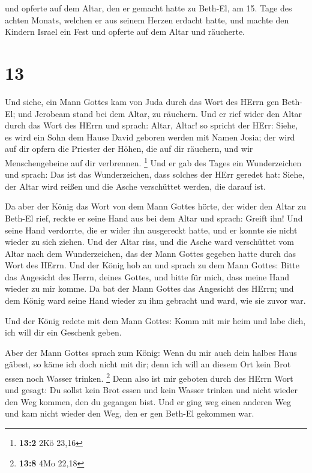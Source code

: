  und opferte auf dem Altar, den er gemacht hatte zu
Beth-El, am 15. Tage des achten Monats, welchen er aus seinem Herzen
erdacht hatte, und machte den Kindern Israel ein Fest und opferte auf
dem Altar und räucherte.

\hypertarget{section-12}{%
\section{13}\label{section-12}}

 Und siehe, ein Mann Gottes kam von Juda durch das Wort
des HErrn gen Beth-El; und Jerobeam stand bei dem Altar, zu räuchern.
 Und er rief wider den Altar durch das Wort des HErrn und
sprach: Altar, Altar! so spricht der HErr: Siehe, es wird ein Sohn dem
Hause David geboren werden mit Namen Josia; der wird auf dir opfern die
Priester der Höhen, die auf dir räuchern, und wir Menschengebeine auf
dir verbrennen. \footnote{\textbf{13:2} 2Kö 23,16}  Und er
gab des Tages ein Wunderzeichen und sprach: Das ist das Wunderzeichen,
dass solches der HErr geredet hat: Siehe, der Altar wird reißen und die
Asche verschüttet werden, die darauf ist.

 Da aber der König das Wort von dem Mann Gottes hörte, der
wider den Altar zu Beth-El rief, reckte er seine Hand aus bei dem Altar
und sprach: Greift ihn! Und seine Hand verdorrte, die er wider ihn
ausgereckt hatte, und er konnte sie nicht wieder zu sich ziehen.
 Und der Altar riss, und die Asche ward verschüttet vom
Altar nach dem Wunderzeichen, das der Mann Gottes gegeben hatte durch
das Wort des HErrn.  Und der König hob an und sprach zu
dem Mann Gottes: Bitte das Angesicht des Herrn, deines Gottes, und bitte
für mich, dass meine Hand wieder zu mir komme. Da bat der Mann Gottes
das Angesicht des HErrn; und dem König ward seine Hand wieder zu ihm
gebracht und ward, wie sie zuvor war.

 Und der König redete mit dem Mann Gottes: Komm mit mir
heim und labe dich, ich will dir ein Geschenk geben.

 Aber der Mann Gottes sprach zum König: Wenn du mir auch
dein halbes Haus gäbest, so käme ich doch nicht mit dir; denn ich will
an diesem Ort kein Brot essen noch Wasser trinken. \footnote{\textbf{13:8}
  4Mo 22,18}  Denn also ist mir geboten durch des HErrn
Wort und gesagt: Du sollst kein Brot essen und kein Wasser trinken und
nicht wieder den Weg kommen, den du gegangen bist.  Und
er ging weg einen anderen Weg und kam nicht wieder den Weg, den er gen
Beth-El gekommen war.

